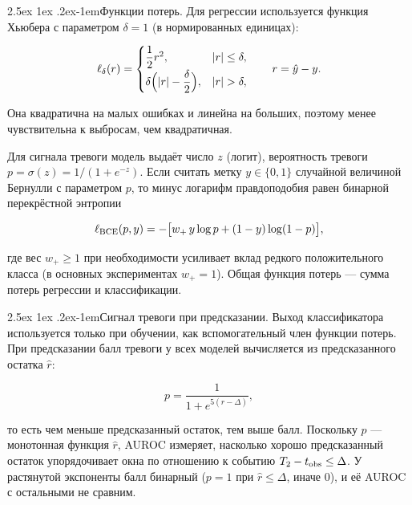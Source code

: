 \documentclass[12pt,a4paper]{report}
\makeatletter
\renewcommand\paragraph{\@startsection{paragraph}{4}{\z@}%
  {2.5ex \@plus1ex \@minus.2ex}{-1em}{\normalfont\normalsize\bfseries}}
\numberwithin{equation}{chapter}
\makeatother
\begin{document}
\paragraph{Функции потерь.} Для регрессии используется функция Хьюбера с
параметром $\delta=1$ (в нормированных единицах):
\begin{keybox}
\begin{equation}
\ell_\delta(r)=\begin{cases}\dfrac12r^2,&|r|\le\delta,\\[4pt]
\delta\Bigl(|r|-\dfrac\delta2\Bigr),&|r|>\delta,\end{cases}
\qquad r=\hat y-y .
\end{equation}
\end{keybox}
Она квадратична на малых ошибках и линейна на больших, поэтому менее
чувствительна к выбросам, чем квадратичная.

Для сигнала тревоги модель выдаёт число $z$ (логит), вероятность тревоги
$p=\sigma(z)=1/(1+e^{-z})$. Если считать метку $y\in\{0,1\}$ случайной
величиной Бернулли с параметром $p$, то минус логарифм правдоподобия равен
бинарной перекрёстной энтропии
\begin{keybox}
\begin{equation}
\ell_{\rm BCE}(p,y)=-\bigl[w_+\,y\log p+(1-y)\log(1-p)\bigr],
\end{equation}
\end{keybox}
где вес $w_+\ge1$ при необходимости усиливает вклад редкого положительного
класса (в основных экспериментах $w_+=1$). Общая
функция потерь --- сумма потерь регрессии и классификации.

\paragraph{Сигнал тревоги при предсказании.} Выход классификатора
используется только при обучении, как вспомогательный член функции потерь.
При предсказании балл тревоги у всех моделей вычисляется из предсказанного
остатка $\hat r$:
\begin{keybox}
\begin{equation}
p=\frac1{1+e^{5(\hat r-\Delta)}} ,
\label{eq:alarm}
\end{equation}
\end{keybox}
то есть чем меньше предсказанный остаток, тем выше балл. Поскольку
$p$ --- монотонная функция $\hat r$, AUROC измеряет, насколько хорошо
предсказанный остаток упорядочивает окна по отношению к событию
$T_2-t_{\rm obs}\le\Delta$. У растянутой экспоненты балл бинарный
($p=1$ при $\hat r\le\Delta$, иначе $0$), и её AUROC с остальными не
сравним.
\end{document}
